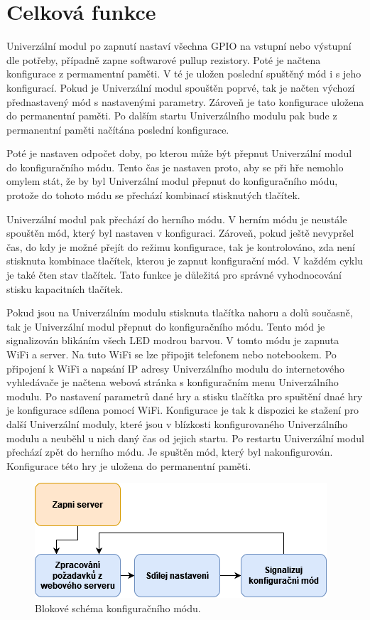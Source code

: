 \section{Celková funkce}
Univerzální modul po zapnutí nastaví všechna GPIO na vstupní nebo výstupní dle potřeby, případně zapne softwarové pullup rezistory. Poté je načtena konfigurace z permamentní paměti. V té je uložen poslední spuštěný 
mód  
i s jeho konfigurací. Pokud je Univerzální modul spouštěn poprvé, tak je načten výchozí přednastavený mód s nastavenými parametry. Zároveň je tato konfigurace uložena do permanentní paměti. Po dalším startu 
Univerzálního modulu pak bude z permanentní paměti načítána poslední konfigurace. 

Poté je nastaven odpočet doby, po kterou může být přepnut Univerzální modul do konfiguračního módu. Tento čas je nastaven proto, aby se při hře nemohlo omylem stát, že by byl Univerzální modul přepnut do 
konfiguračního módu, protože do tohoto módu se přechází kombinací stisknutých tlačítek. 

Univerzální modul pak přechází do herního módu. V herním módu je neustále spouštěn mód, který byl nastaven v konfiguraci. Zároveň, pokud ještě nevypršel čas, do kdy je možné přejít do režimu konfigurace, tak 
je kontrolováno, zda není stisknuta kombinace tlačítek, kterou je zapnut konfigurační mód. V každém cyklu je také čten stav tlačítek. Tato funkce je důležitá pro správné vyhodnocování stisku kapacitních tlačítek. 

Pokud jsou na Univerzálním modulu stisknuta tlačítka nahoru a dolů současně, tak je Univerzální modul přepnut do konfiguračního módu. Tento mód je signalizován blikáním všech LED modrou barvou. V tomto módu je zapnuta WiFi a server. Na 
tuto WiFi se lze připojit telefonem nebo notebookem. Po připojení k WiFi a napsání IP adresy Univerzálního modulu do internetového vyhledávače je načtena webová stránka s konfiguračním menu Univerzálního modulu. Po nastavení parametrů 
dané hry a stisku 
tlačítka pro spuštění dnaé hry je konfigurace sdílena pomocí WiFi. Konfigurace je tak k dispozici ke stažení pro další Univerzální moduly, které jsou v blízkosti konfigurovaného Univerzálního modulu a neuběhl u nich daný čas od jejich 
startu. Po restartu Univerzální modul přechází zpět do herního módu. Je spuštěn mód, který byl nakonfigurován. Konfigurace této hry je uložena do permanentní paměti.

\begin{figure}[!h]
  \begin{center}
    \includegraphics[scale=0.8]{obrazky/blokove_schema_modu_CONFIGURATION.png}
  \end{center}
  \caption[Blokové schéma konfiguračního módu]{Blokové schéma konfiguračního módu.}
\end{figure}

